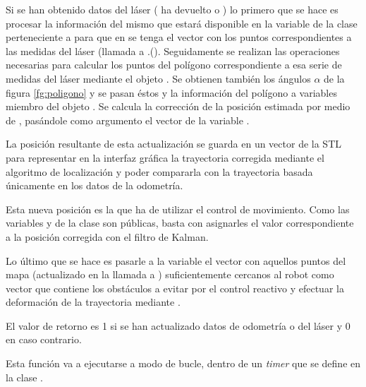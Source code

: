 Si se han obtenido datos del láser ( ha devuelto  o ) lo primero que se hace es procesar la información del mismo que estará disponible en la variable de la clase  perteneciente a  para que en  se tenga el vector  con los puntos correspondientes a las medidas del láser (llamada a .().
Seguidamente se realizan las operaciones necesarias para calcular los puntos del polígono correspondiente a esa serie de medidas del láser mediante el objeto . Se obtienen también los ángulos $\alpha$ de la figura \ref{fg:poligono} y se pasan éstos y la información del polígono a variables miembro del objeto . Se calcula la corrección de la posición estimada por medio de , pasándole como argumento el vector  de la variable .

La posición resultante de esta actualización se guarda en un vector de la STL para representar en la interfaz gráfica la trayectoria corregida mediante el algoritmo de localización y poder compararla con la trayectoria basada únicamente en los datos de la odometría.

Esta nueva posición es la que ha de utilizar el control de movimiento. Como las variables  y  de la clase  son públicas, basta con asignarles el valor correspondiente a la posición corregida con el filtro de Kalman.

Lo último que se hace es pasarle a la variable  el vector con aquellos puntos del mapa (actualizado en la llamada a ) suficientemente cercanos al robot como vector que contiene los obstáculos a evitar por el control reactivo y efectuar la deformación de la trayectoria mediante .

El valor de retorno es 1 si se han actualizado datos de odometría o del láser y 0 en caso contrario.

Esta función va a ejecutarse a modo de bucle, dentro de un \emph{timer} que se define en la clase .

